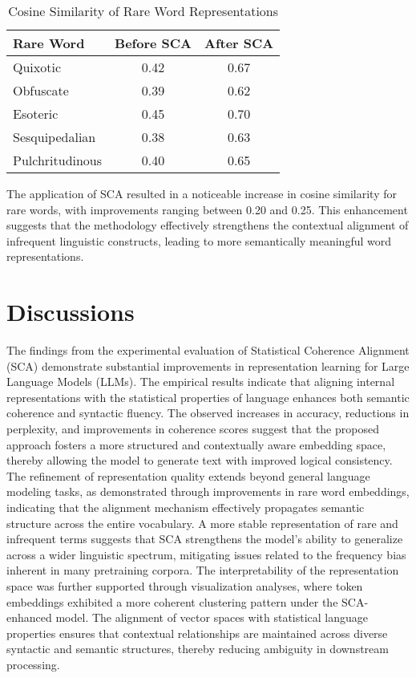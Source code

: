 \documentclass{article}
\begin{document}
\begin{table}[h]
	\centering
	\caption{Cosine Similarity of Rare Word Representations}
	\label{tab:rare_words}
	\renewcommand{\arraystretch}{1.2}
	\setlength{\arrayrulewidth}{0.4mm}
	\setlength{\tabcolsep}{8pt}
		\begin{tabular}{|l|c|c|}
			\hline
			\textbf{Rare Word} & \textbf{Before SCA} & \textbf{After SCA} \\
			\hline
			Quixotic & 0.42 & 0.67 \\
			Obfuscate & 0.39 & 0.62 \\
			Esoteric & 0.45 & 0.70 \\
			Sesquipedalian & 0.38 & 0.63 \\
			Pulchritudinous & 0.40 & 0.65 \\
			\hline
		\end{tabular}
\end{table}

The application of SCA resulted in a noticeable increase in cosine similarity for rare words, with improvements ranging between 0.20 and 0.25. This enhancement suggests that the methodology effectively strengthens the contextual alignment of infrequent linguistic constructs, leading to more semantically meaningful word representations.




\section{Discussions}

The findings from the experimental evaluation of Statistical Coherence Alignment (SCA) demonstrate substantial improvements in representation learning for Large Language Models (LLMs). The empirical results indicate that aligning internal representations with the statistical properties of language enhances both semantic coherence and syntactic fluency. The observed increases in accuracy, reductions in perplexity, and improvements in coherence scores suggest that the proposed approach fosters a more structured and contextually aware embedding space, thereby allowing the model to generate text with improved logical consistency. The refinement of representation quality extends beyond general language modeling tasks, as demonstrated through improvements in rare word embeddings, indicating that the alignment mechanism effectively propagates semantic structure across the entire vocabulary. A more stable representation of rare and infrequent terms suggests that SCA strengthens the model’s ability to generalize across a wider linguistic spectrum, mitigating issues related to the frequency bias inherent in many pretraining corpora. The interpretability of the representation space was further supported through visualization analyses, where token embeddings exhibited a more coherent clustering pattern under the SCA-enhanced model. The alignment of vector spaces with statistical language properties ensures that contextual relationships are maintained across diverse syntactic and semantic structures, thereby reducing ambiguity in downstream processing.
\end{document}
